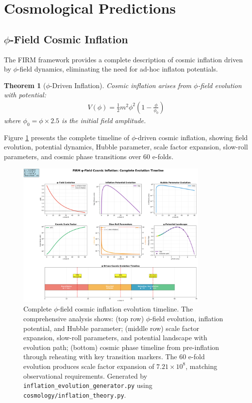 \documentclass[12pt]{article}
\newtheorem{theorem}{Theorem}
\begin{document}
\section{Cosmological Predictions}

\subsection{$\phi$-Field Cosmic Inflation}

The FIRM framework provides a complete description of cosmic inflation driven by $\phi$-field dynamics, eliminating the need for ad-hoc inflaton potentials.

\begin{theorem}[$\phi$-Driven Inflation]
\label{thm:phi_inflation}
Cosmic inflation arises from $\phi$-field evolution with potential:
\begin{align}
V(\phi) = \frac{1}{2}m^2\phi^2\left(1 - \frac{\phi}{\phi_0}\right)
\end{align}
where $\phi_0 = \phi \times 2.5$ is the initial field amplitude.
\end{theorem}

Figure \ref{fig:inflation_evolution} presents the complete timeline of $\phi$-driven cosmic inflation, showing field evolution, potential dynamics, Hubble parameter, scale factor expansion, slow-roll parameters, and cosmic phase transitions over 60 e-folds.

\begin{figure}[H]
    \centering
    \includegraphics[width=0.85\textwidth]{figures/outputs/inflation_evolution.png}
    \caption{Complete $\phi$-field cosmic inflation evolution timeline. The comprehensive analysis shows: (top row) $\phi$-field evolution, inflation potential, and Hubble parameter; (middle row) scale factor expansion, slow-roll parameters, and potential landscape with evolution path; (bottom) cosmic phase timeline from pre-inflation through reheating with key transition markers. The 60 e-fold evolution produces scale factor expansion of $7.21 \times 10^8$, matching observational requirements. Generated by \texttt{inflation\_evolution\_generator.py} using \texttt{cosmology/inflation\_theory.py}.}
    \label{fig:inflation_evolution}
\end{figure}
\end{document}
